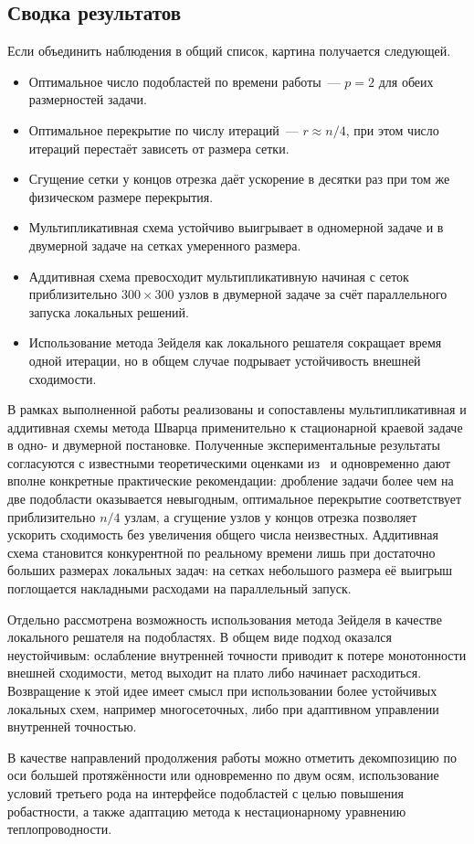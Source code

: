 \subsection{Сводка результатов}

Если объединить наблюдения в общий список, картина получается следующей.
\begin{itemize}
    \item Оптимальное число подобластей по времени работы~--- $p=2$ для
    обеих размерностей задачи.
    \item Оптимальное перекрытие по числу итераций~--- $r\approx n/4$, при
    этом число итераций перестаёт зависеть от размера сетки.
    \item Сгущение сетки у концов отрезка даёт ускорение в десятки раз при
    том же физическом размере перекрытия.
    \item Мультипликативная схема устойчиво выигрывает в одномерной задаче и
    в двумерной задаче на сетках умеренного размера.
    \item Аддитивная схема превосходит мультипликативную начиная с сеток
    приблизительно $300\times 300$ узлов в двумерной задаче за счёт
    параллельного запуска локальных решений.
    \item Использование метода Зейделя как локального решателя сокращает
    время одной итерации, но в общем случае подрывает устойчивость внешней
    сходимости.
\end{itemize}


В рамках выполненной работы реализованы и сопоставлены мультипликативная и
аддитивная схемы метода Шварца применительно к стационарной краевой задаче
в одно- и двумерной постановке. Полученные экспериментальные результаты
согласуются с известными теоретическими оценками из~\cite{toselli2005,
quarteroni1999} и одновременно дают вполне конкретные практические
рекомендации: дробление задачи более чем на две подобласти оказывается
невыгодным, оптимальное перекрытие соответствует приблизительно $n/4$
узлам, а сгущение узлов у концов отрезка позволяет ускорить сходимость без
увеличения общего числа неизвестных. Аддитивная схема становится
конкурентной по реальному времени лишь при достаточно больших размерах
локальных задач: на сетках небольшого размера её выигрыш поглощается
накладными расходами на параллельный запуск.

Отдельно рассмотрена возможность использования метода Зейделя в качестве
локального решателя на подобластях. В общем виде подход оказался
неустойчивым: ослабление внутренней точности приводит к потере монотонности
внешней сходимости, метод выходит на плато либо начинает расходиться.
Возвращение к этой идее имеет смысл при использовании более устойчивых
локальных схем, например многосеточных, либо при адаптивном управлении
внутренней точностью.

В качестве направлений продолжения работы можно отметить декомпозицию по оси
большей протяжённости или одновременно по двум осям, использование
условий третьего рода на интерфейсе подобластей с целью повышения
робастности, а также адаптацию метода к нестационарному уравнению
теплопроводности.
